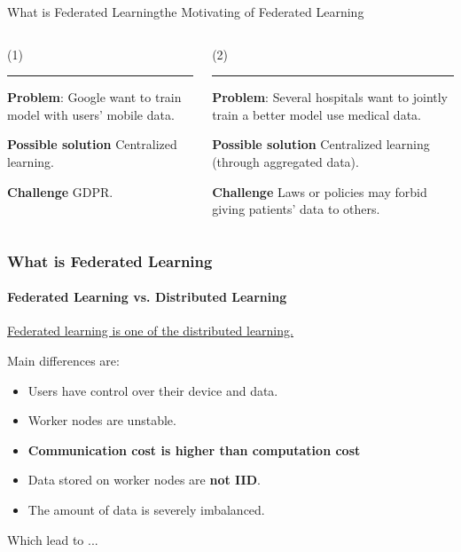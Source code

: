 \documentclass[UTF8,aspectratio=169,presentation]{ctexbeamer}
\begin{document}
\begin{frame}{What is Federated Learning}{the Motivating of Federated Learning}
\begin{columns}[T] %
\begin{column}{.48\textwidth}
\color{red}
\eg (1)
\rule{\linewidth}{4pt}
\color{black}


\textbf{Problem}: Google want to train model with users' mobile data.

\textbf{Possible solution} Centralized learning.

\textbf{Challenge} \eg GDPR.


\end{column}%
\hfill%
\begin{column}{.48\textwidth}
\color{blue}
\eg (2)
\rule{\linewidth}{4pt}
\color{black}

\textbf{Problem}: Several hospitals want to jointly train a better model use medical data.

\textbf{Possible solution} Centralized learning (through aggregated data).

\textbf{Challenge} Laws or policies may forbid giving patients' data to others.
\end{column}%
\end{columns}


\end{frame}


\begin{frame}
  \frametitle{What is Federated Learning}
  \framesubtitle{Federated Learning vs. Distributed Learning}
  \begin{center}
    \underline{Federated learning is one of the distributed learning.}
  \end{center}
  \vspace{0.5cm}

Main differences are:
\begin{itemize}
  \item Users have control over their device and data.
  \item Worker nodes are unstable.
  \item \textbf{Communication cost is higher than computation cost}
  \item Data stored on worker nodes are \textbf{not IID}.
  \item The amount of data is severely imbalanced.
\end{itemize}



Which lead to ...

\end{frame}
\end{document}
